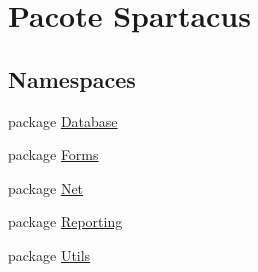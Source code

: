 \hypertarget{namespaceSpartacus}{\section{Pacote Spartacus}
\label{namespaceSpartacus}
}
\subsection*{Namespaces}
\begin{DoxyCompactItemize}
\item 
package \hyperlink{namespaceSpartacus_1_1Database}{Database}
\item 
package \hyperlink{namespaceSpartacus_1_1Forms}{Forms}
\item 
package \hyperlink{namespaceSpartacus_1_1Net}{Net}
\item 
package \hyperlink{namespaceSpartacus_1_1Reporting}{Reporting}
\item 
package \hyperlink{namespaceSpartacus_1_1Utils}{Utils}
\end{DoxyCompactItemize}
